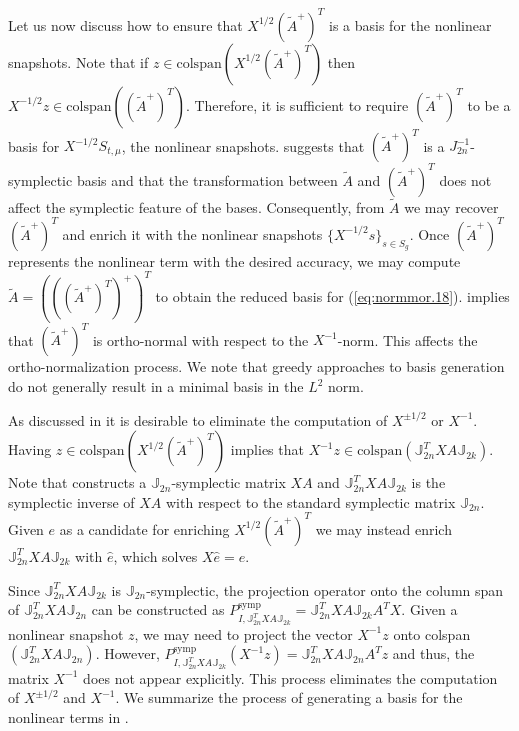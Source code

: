 Let us now discuss how to ensure that $X^{1/2} (\tilde A^+)^T$ is a basis for the nonlinear snapshots. Note that if $z \in \text{colspan}\left(X^{1/2} (\tilde A^+)^T\right)$ then $X^{-1/2} z \in \text{colspan}\left(( \tilde A^+)^T \right)$. Therefore, it is sufficient to require $(\tilde A^+)^T$ to be a basis for $X^{-1/2}S_{t,\mu}$, the nonlinear snapshots.  suggests that $(\tilde A^+)^T$ is a $J_{2n}^{-1}$-symplectic basis and that the transformation between $\tilde A$ and $(\tilde A^+)^T $ does not affect the symplectic feature of the bases. Consequently, from $\tilde A$ we may recover $(\tilde A^+)^T$ and enrich it with the nonlinear snapshots $\{ X^{-1/2} s \}_{s\in S_{g}}$. Once $(\tilde A^+)^T$ represents the nonlinear term with the desired accuracy, we may compute $\tilde A= \left( \left( ( \tilde A^+ )^T \right)^+ \right)^T$ to obtain the reduced basis for (\ref{eq:normmor.18}).  implies that $(\tilde A^+)^T$ is ortho-normal with respect to the $X^{-1}$-norm. This affects the ortho-normalization process. We note that greedy approaches to basis generation do not generally result in a minimal basis in the $L^{2}$ norm.

As discussed in  it is desirable to eliminate the computation of $X^{\pm 1/2}$ or $X^{-1}$. Having $z \in \text{colspan}\left(X^{1/2} (\tilde A^+)^T\right)$ implies that $X^{-1} z \in \text{colspan}(\mathbb J_{2n}^T X A \mathbb J_{2k})$. Note that  constructs a $\mathbb J_{2n}$-symplectic matrix $XA$ and $\mathbb J_{2n}^T X A \mathbb J_{2k}$ is the symplectic inverse of $XA$ with respect to the standard symplectic matrix $\mathbb J_{2n}$. Given $e$ as a candidate for enriching $X^{1/2} (\tilde A^+)^T$ we may instead enrich $\mathbb J_{2n}^T X A \mathbb J_{2k}$ with $\hat e$, which solves $X \hat e = e$.

Since  $\mathbb J_{2n}^T X A \mathbb J_{2k}$ is $\mathbb J_{2n}$-symplectic, the projection operator onto the column span of $\mathbb J_{2n}^T X A \mathbb J_{2n}$ can be constructed as $P^{\text{symp}}_{I,\mathbb J_{2n}^T X A \mathbb J_{2k}}=\mathbb J_{2n}^T X A \mathbb J_{2k}A^TX$. Given a nonlinear snapshot $z$, we may need to project the vector $X^{-1}z$ onto colspan$(\mathbb J_{2n}^T X A \mathbb J_{2n})$. However, $P^{\text{symp}}_{I,\mathbb J_{2n}^T X A \mathbb J_{2k}}(X^{-1}z)=\mathbb J_{2n}^T X A \mathbb J_{2n}A^Tz$ and thus, the matrix $X^{-1}$ does not appear explicitly. This process eliminates the computation of $X^{\pm 1/2}$ and $X^{-1}$. We summarize the process of generating a basis for the nonlinear terms in .


